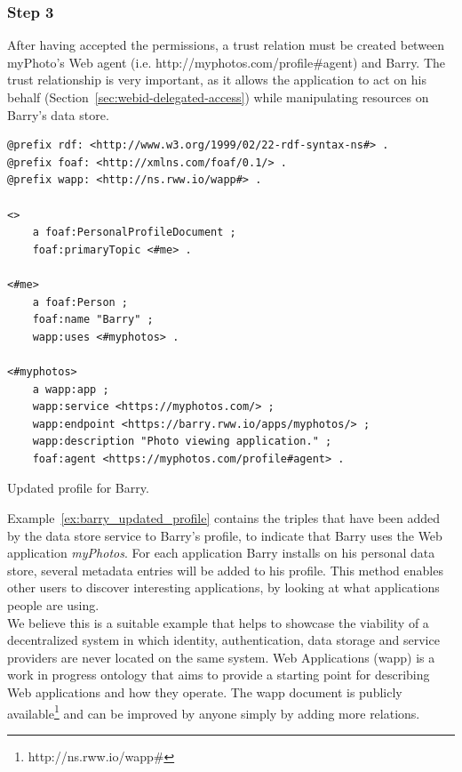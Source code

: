 \subsubsection{Step 3}
After having accepted the permissions, a trust relation must be created between myPhoto's Web agent (i.e. http://myphotos.com/profile\#agent) and Barry. The trust relationship is very important, as it allows the application to act on his behalf (Section~\ref{sec:webid-delegated-access}) while manipulating resources on Barry's data store.\\

\begin{example}[h]
\begin{verbatim}
@prefix rdf: <http://www.w3.org/1999/02/22-rdf-syntax-ns#> .
@prefix foaf: <http://xmlns.com/foaf/0.1/> .
@prefix wapp: <http://ns.rww.io/wapp#> .

<>
    a foaf:PersonalProfileDocument ;
    foaf:primaryTopic <#me> .

<#me>
    a foaf:Person ;
    foaf:name "Barry" ;
    wapp:uses <#myphotos> .

<#myphotos> 
    a wapp:app ;
    wapp:service <https://myphotos.com/> ;
    wapp:endpoint <https://barry.rww.io/apps/myphotos/> ;
    wapp:description "Photo viewing application." ;
    foaf:agent <https://myphotos.com/profile#agent> .
\end{verbatim}
\caption{Updated profile for Barry.}
\label{ex:barry_updated_profile}
\end{example}

Example~\ref{ex:barry_updated_profile} contains the triples that have been added by the data store service to Barry's profile, to indicate that Barry uses the Web application \textit{myPhotos}. For each application Barry installs on his personal data store, several metadata entries will be added to his profile. This method enables other users to discover interesting applications, by looking at what applications people are using.\\

We believe this is a suitable example that helps to showcase the viability of a decentralized system in which identity, authentication, data storage and service providers are never located on the same system. Web Applications (wapp) is a work in progress ontology that aims to provide a starting point for describing Web applications and how they operate. The wapp document is publicly available\footnote{http://ns.rww.io/wapp\#} and can be improved by anyone simply by adding more relations.


